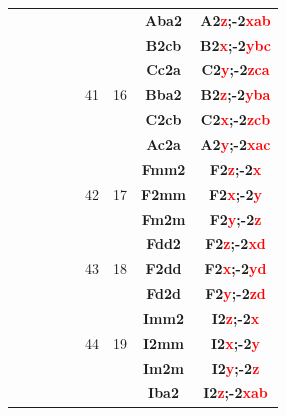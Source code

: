 \documentclass{article}      %
\begin{document}
\begin{small}
\begin{longtable}[c]{|c|c|c|c|c|c|c|c|c|}
          &  & & & &  & &\textbf{Aba2}         &\textbf{A2\textcolor{red}{z};-2\textcolor{red}{xab}}\\\cline{8-9}         
          &  & & & &  & &\textbf{B2cb}         &\textbf{B2\textcolor{red}{x};-2\textcolor{red}{ybc}}\\\cline{8-9}         
          &  & & & &  & &\textbf{Cc2a}         &\textbf{C2\textcolor{red}{y};-2\textcolor{red}{zca}}\\\cline{8-9}         
	  &  & & & &\textrm{41}  &\textrm{16} &\textbf{Bba2}         &\textbf{B2\textcolor{red}{z};-2\textcolor{red}{yba}}\\\cline{8-9}         
          &  & & & &  & &\textbf{C2cb}         &\textbf{C2\textcolor{red}{x};-2\textcolor{red}{zcb}}\\\cline{8-9}         
          &  & & & &  & &\textbf{Ac2a}         &\textbf{A2\textcolor{red}{y};-2\textcolor{red}{xac}}\\\cline{6-9}         
          &  & & & & & &\textbf{Fmm2}         &\textbf{F2\textcolor{red}{z};-2\textcolor{red}{x}}\\\cline{8-9}           
	  &  & & & &\textrm{42}  &\textrm{17} &\textbf{F2mm}         &\textbf{F2\textcolor{red}{x};-2\textcolor{red}{y}}\\\cline{8-9}           
          &  & & & &  & &\textbf{Fm2m}         &\textbf{F2\textcolor{red}{y};-2\textcolor{red}{z}}\\\cline{6-9}           
          &  & & & &  & &\textbf{Fdd2}         &\textbf{F2\textcolor{red}{z};-2\textcolor{red}{xd}}\\\cline{8-9}          
	  &  & & & &\textrm{43}  &\textrm{18} &\textbf{F2dd}         &\textbf{F2\textcolor{red}{x};-2\textcolor{red}{yd}}\\\cline{8-9}          
          &  & & & &  & &\textbf{Fd2d}         &\textbf{F2\textcolor{red}{y};-2\textcolor{red}{zd}}\\\cline{6-9}          
          &  & & & &  & &\textbf{Imm2}         &\textbf{I2\textcolor{red}{z};-2\textcolor{red}{x}}\\\cline{8-9}           
	  &  & & & &\textrm{44}  &\textrm{19} &\textbf{I2mm}         &\textbf{I2\textcolor{red}{x};-2\textcolor{red}{y}}\\\cline{8-9}           
          &  & & & &  & &\textbf{Im2m}         &\textbf{I2\textcolor{red}{y};-2\textcolor{red}{z}}\\\cline{6-9}           
          &  & & & &  & &\textbf{Iba2}         &\textbf{I2\textcolor{red}{z};-2\textcolor{red}{xab}}\\\cline{8-9}         

\end{longtable}
\end{small}
\end{document}
